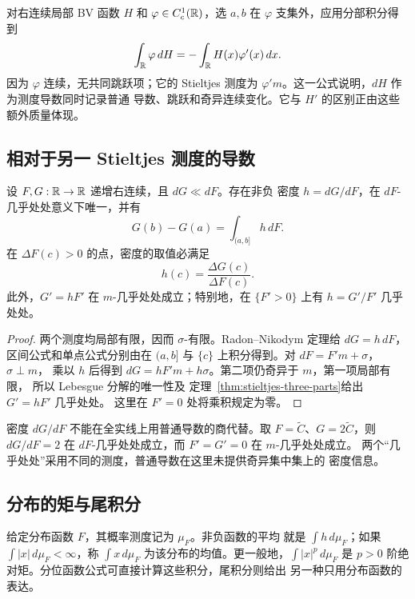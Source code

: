 对右连续局部 BV 函数 \(H\) 和 \(\varphi\in C_c^1(\mathbb{R})\)，选
\(a,b\) 在 \(\varphi\) 支集外，应用分部积分得到
\begin{equation}\label{eq:stieltjes-measure-derivative}
 \int_{\mathbb{R}}\varphi\,dH=-\int_{\mathbb{R}} H(x)\varphi'(x)\,dx.
\end{equation}
因为 \(\varphi\) 连续，无共同跳跃项；它的 Stieltjes 测度为
\(\varphi' m\)。这一公式说明，\(dH\) 作为测度导数同时记录普通
导数、跳跃和奇异连续变化。它与 \(H'\) 的区别正由这些额外质量体现。

\subsection{相对于另一 Stieltjes 测度的导数}

\begin{proposition}\label{prop:stieltjes-relative-density}
设 \(F,G:\mathbb{R}\to\mathbb{R}\) 递增右连续，且 \(dG\ll dF\)。存在非负
密度 \(h=dG/dF\)，在 \(dF\)-几乎处处意义下唯一，并有
\[
 G(b)-G(a)=\int_{(a,b]}h\,dF.
\]
在 \(\Delta F(c)>0\) 的点，密度的取值必满足
\[
 h(c)=\frac{\Delta G(c)}{\Delta F(c)}.
\]
此外，\(G'=hF'\) 在 \(m\)-几乎处处成立；特别地，在
\(\{F'>0\}\) 上有 \(h=G'/F'\) 几乎处处。
\end{proposition}
\begin{proof}
两个测度均局部有限，因而 \(\sigma\)-有限。Radon--Nikodym 定理给
\(dG=h\,dF\)，区间公式和单点公式分别由在 \((a,b]\) 与
\(\{c\}\) 上积分得到。对 \(dF=F'm+\sigma\)，\(\sigma\perp m\)，
乘以 \(h\) 后得到
\(dG=hF'm+h\sigma\)。第二项仍奇异于 \(m\)，第一项局部有限，
所以 Lebesgue 分解的唯一性及
定理~\ref{thm:stieltjes-three-parts}给出 \(G'=hF'\) 几乎处处。
这里在 \(F'=0\) 处将乘积规定为零。
\end{proof}

密度 \(dG/dF\) 不能在全实线上用普通导数的商代替。取
\(F=\widetilde C\)、\(G=2\widetilde C\)，则 \(dG/dF=2\)
在 \(dF\)-几乎处处成立，而 \(F'=G'=0\) 在 \(m\)-几乎处处成立。
两个“几乎处处”采用不同的测度，普通导数在这里未提供奇异集中集上的
密度信息。

\subsection{分布的矩与尾积分}

给定分布函数 \(F\)，其概率测度记为 \(\mu_F\)。非负函数的平均
就是 \(\int h\,d\mu_F\)；如果 \(\int|x|\,d\mu_F<\infty\)，称
\(\int x\,d\mu_F\) 为该分布的均值。更一般地，\(\int|x|^p\,d\mu_F\)
是 \(p>0\) 阶绝对矩。分位函数公式可直接计算这些积分，尾积分则给出
另一种只用分布函数的表达。

